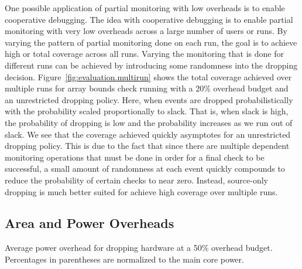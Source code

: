One possible application of partial monitoring with low overheads is to enable
cooperative debugging. The idea with cooperative debugging is to enable partial
monitoring with very low overheads across a large number of users or runs. By
varying the pattern of partial monitoring done on each run, the goal is to
achieve high or total coverage across all runs. Varying the monitoring that is
done for different runs can be achieved by introducing some randomness into the
dropping decision. Figure~\ref{fig:evaluation.multirun} shows the total
coverage achieved over multiple runs for array bounds check running with a 20\%
overhead budget and an unrestricted dropping policy. Here, when events are
dropped probabilistically with the probability scaled proportionally to slack.
That is, when slack is high, the probability of dropping is low and the
probability increases as we run out of slack. We see that the coverage achieved
quickly asymptotes for an unrestricted dropping policy. This is due to the fact
that since there are multiple dependent monitoring operations that must be done
in order for a final check to be successful, a small amount of randomness at
each event quickly compounds to reduce the probability of certain checks to
near zero. Instead, source-only dropping is much better suited for achieve high
coverage over multiple runs.

\subsection{Area and Power Overheads}

\begin{table}[tb]
  \begin{center}
    \vspace{-0.0in}
    \begin{footnotesize}
    
    \end{footnotesize}
    \caption{Average power overhead for dropping hardware at a 50\% overhead
    budget. Percentages in parentheses are normalized to the main core
    power.}
    \vspace{-0.2in}
    \label{tab:evaluation.area_power}
  \end{center}
\end{table}

